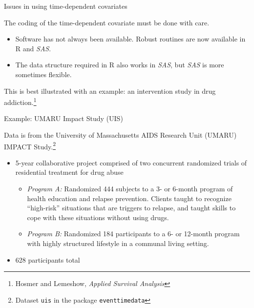 \documentclass[ignorenonframetext,]{beamer}
\begin{document}
\begin{frame}{%
\protect\hypertarget{issues-in-using-time-dependent-covariates}{%
Issues in using time-dependent covariates}}

The coding of the time-dependent covariate must be done with care.

\begin{itemize}
\item
  Software has not always been available. Robust routines are now
  available in \textsf{R} and \emph{SAS}.
\item
  The data structure required in \textsf{R} also works in \emph{SAS},
  but \emph{SAS} is more sometimes flexible.
\end{itemize}

This is best illustrated with an example: an intervention study in drug
addiction.\footnote{Hosmer and Lemeshow, \textit{Applied Survival Analysis}}

\end{frame}

\begin{frame}{%
\protect\hypertarget{example-umaru-impact-study-uis}{%
Example: UMARU Impact Study (UIS)}}

Data is from the University of Massachusetts AIDS Research Unit (UMARU)
IMPACT
Study.\footnote{Dataset \texttt{uis} in the package \texttt{eventtimedata}}

\begin{itemize}
\item
  5-year collaborative project comprised of two concurrent randomized
  trials of residential treatment for drug abuse

  \begin{itemize}
  \item
    \emph{Program A:} Randomized 444 subjects to a 3- or 6-month program
    of health education and relapse prevention. Clients taught to
    recognize “high-risk” situations that are triggers to relapse, and
    taught skills to cope with these situations without using drugs.
  \item
    \emph{Program B:} Randomized 184 participants to a 6- or 12-month
    program with highly structured lifestyle in a communal living
    setting.
  \end{itemize}
\item
  628 participants total
\end{itemize}

\end{frame}
\end{document}

